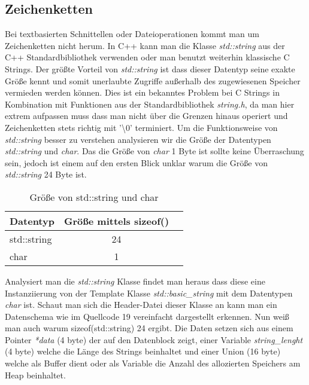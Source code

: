 \documentclass[MES,Master,ngerman]{twbook}%
\begin{document}
\subsection{Zeichenketten}
Bei textbasierten Schnittellen oder Dateioperationen kommt man um Zeichenketten nicht herum. In C++ kann man die Klasse \textit{std::string} aus der C++ Standardbibliothek verwenden oder man benutzt weiterhin klassische C Strings. Der größte Vorteil von \textit{std::string} ist dass dieser Datentyp seine exakte Größe kennt und somit unerlaubte Zugriffe außerhalb des zugewiesenen Speicher vermieden werden können. Dies ist ein bekanntes Problem bei C Strings in Kombination mit Funktionen aus der Standardbibliothek \textit{string.h}, da man hier extrem aufpassen muss dass man nicht über die Grenzen hinaus operiert und Zeichenketten stets richtig mit '\textbackslash 0' terminiert. \newline\newline
Um die Funktionsweise von \textit{std::string} besser zu verstehen analysieren wir die Größe der Datentypen \textit{std::string} und \textit{char}. Das die Größe von \textit{char} 1 Byte ist sollte keine Überraschung sein, jedoch ist einem auf den ersten Blick unklar warum die Größe von \textit{std::string} 24 Byte ist.

\begin{table}[!htb]
	\centering
	\begin{tabular}{| l | c | r |}
		\hline
		\textbf{Datentyp}  & \textbf{Größe mittels sizeof()} \\ \hline
		std::string        & 24 \\ \hline
		char       		   & 1  \\ \hline
	\end{tabular}
	
	\caption{Größe von std::string und char}
	\label{tbl:size_string_char}
	
\end{table}

Analysiert man die \textit{std::string} Klasse findet man heraus dass diese eine Instanziierung von der Template Klasse \textit{std::basic\_string} mit dem Datentypen \textit{char} ist. Schaut man sich die Header-Datei dieser Klasse an kann man ein Datenschema wie im Quellcode 19 vereinfacht dargestellt erkennen. Nun weiß man auch warum sizeof(std::string) 24 ergibt. Die Daten setzen sich aus einem Pointer \textit{*data} (4 byte) der auf den Datenblock zeigt, einer Variable \textit{string\_lenght} (4 byte) welche die Länge des Strings beinhaltet und einer Union (16 byte) welche als Buffer dient oder als Variable die Anzahl des allozierten Speichers am Heap beinhaltet.\newline
\end{document}
